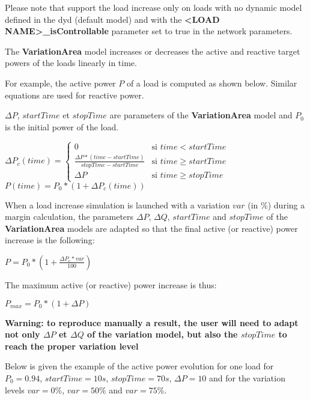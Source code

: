 \documentclass[a4paper, 12pt]{report}
\begin{document}
Please note that \Dynawo support the load increase only on 
loads with no dynamic model defined in the dyd (default model) and with the \textbf{<LOAD NAME>\_isControllable} parameter set to true in the network parameters. 

The \textbf{VariationArea} model increases 
or decreases the active and reactive target powers of the loads linearly in time.

For example, the active power $P$ of a load is computed as shown below. Similar equations are used for reactive power.

$\Delta P$, $startTime$ et $stopTime$ are parameters of the \textbf{VariationArea} model and $P_0$ is the initial power of the load.

\begin{center}
$\Delta P_c(time) = \left\{
    \begin{array}{ll}
        0 & \mbox{si } time<startTime \\
        \frac{\Delta P*(time-startTime)}{stopTime-startTime} & \mbox{si } time \geq startTime \\
        \Delta P & \mbox{si } time \geq stopTime
    \end{array}
\right. $\\
$P(time) = P_0*(1+\Delta P_c(time)) $
\end{center}

When a load increase simulation is launched with a variation $var$ (in \%) during a margin calculation, 
the parameters $\Delta P$, $\Delta Q$, $startTime$ and $stopTime$ of the \textbf{VariationArea} models are adapted so that the final 
active (or reactive) power increase is the following:

\begin{center}
$P = P_0*(1+\frac{\Delta P_c*var}{100}) $
\end{center}

The maximum active (or reactive) power increase is thus:
\begin{center}
$P_{max} = P_0*(1+\Delta P) $\\
\end{center}

\textbf{Warning: to reproduce manually a result, the user will need to adapt not only $\Delta P$ et $\Delta Q$ of the variation model, but also the $stopTime$ 
to reach the proper variation level}

Below is given the example of the active power evolution for one load for $P_0 = 0.94$, $startTime = 10s$, $stopTime=70s$, $\Delta P = 10$ 
and for the variation levels  $var=0$\%, $var=50$\% and $var=75$\%.
\end{document}
